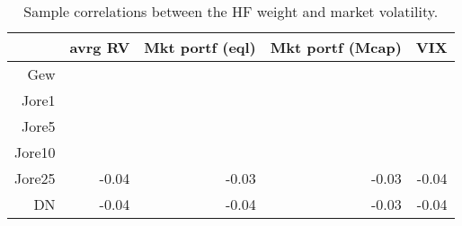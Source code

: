 \begin{table}[ht]
\centering
\caption{Sample correlations between the HF weight and
             market volatility.} 
\label{table:corrs_5stepahead}
\begin{tabular}{rrrrr}
  \hline
 & avrg RV & Mkt portf (eql) & Mkt portf (Mcap) & VIX \\ 
  \hline
Gew &  &  &  &  \\ 
  Jore1 &  &  &  &  \\ 
  Jore5 &  &  &  &  \\ 
  Jore10 &  &  &  &  \\ 
  Jore25 & -0.04 & -0.03 & -0.03 & -0.04 \\ 
  DN & -0.04 & -0.04 & -0.03 & -0.04 \\ 
   \hline
\end{tabular}
\end{table}

